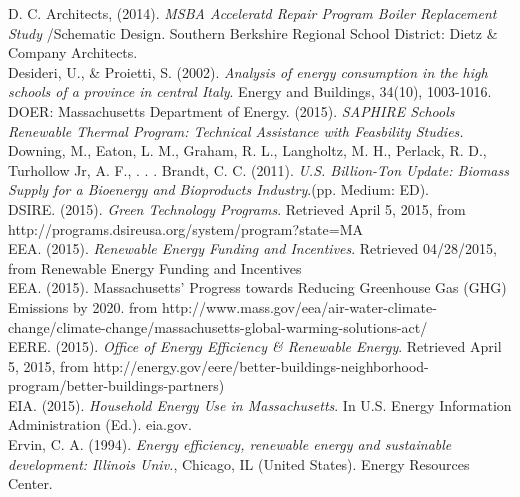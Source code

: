 \hangindent=0.5in
D. C. Architects, (2014). \emph{MSBA Acceleratd Repair Program Boiler Replacement Study} \slash  Schematic Design. Southern Berkshire Regional School District: Dietz \& Company Architects. \\

\hangindent=0.5in
Desideri, U., \& Proietti, S. (2002). \emph{Analysis of energy consumption in the high schools of a province in central Italy}. Energy and Buildings, 34(10), 1003-1016. \\

\hangindent=0.5in
DOER: Massachusetts Department of Energy. (2015). \emph{SAPHIRE Schools Renewable Thermal Program: Technical Assistance with Feasbility Studies.} \\

\hangindent=0.5in
Downing, M., Eaton, L. M., Graham, R. L., Langholtz, M. H., Perlack, R. D., Turhollow Jr, A. F., . . . Brandt, C. C. (2011). \emph{U.S. Billion-Ton Update: Biomass Supply for a Bioenergy and Bioproducts Industry}.(pp. Medium: ED). \\

\hangindent=0.5in
DSIRE. (2015). \emph{Green Technology Programs}. Retrieved April 5, 2015, from http:\slash \slash programs.dsireusa.org\slash system\slash program?state=MA \\

\hangindent=0.5in
EEA. (2015). \emph{Renewable Energy Funding and Incentives}. Retrieved 04\slash 28\slash 2015, from Renewable Energy Funding and Incentives \\

\hangindent=0.5in
EEA. (2015). Massachusetts’ Progress towards Reducing Greenhouse Gas (GHG) Emissions by 2020. from http:\slash \slash www.mass.gov\slash eea\slash air-water-climate-change\slash climate-change\slash massachusetts-global-warming-solutions-act\slash  \\

\hangindent=0.5in
EERE. (2015). \emph{Office of Energy Efficiency \& Renewable Energy}. Retrieved April 5, 2015, from http:\slash \slash energy.gov\slash eere\slash better-buildings-neighborhood-program\slash better-buildings-partners) \\

\hangindent=0.5in
EIA. (2015). \emph{Household Energy Use in Massachusetts}. In U.S. Energy Information Administration (Ed.). eia.gov. \\

\hangindent=0.5in
Ervin, C. A. (1994). \emph{Energy efficiency, renewable energy and sustainable development: Illinois Univ.}, Chicago, IL (United States). Energy Resources Center. \\

